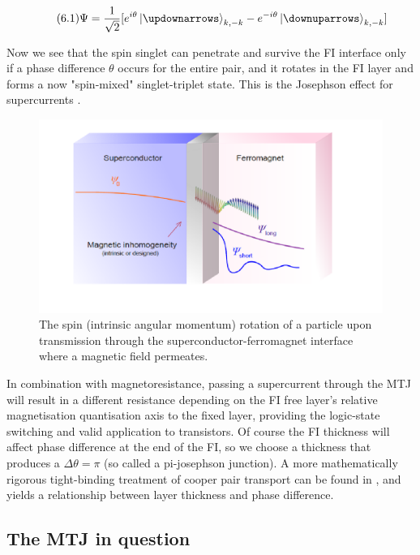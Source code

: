 \documentclass[12pt]{article}
\begin{document}
\begin{equation} \label{4.1} \tag{6.1}
\Psi=\frac{1}{\sqrt{2}}[e^{i\theta}\ket{\updownarrows}_{k,-k}- e^{-i\theta}\ket{\downuparrows}_{k,-k}]
\end{equation}

Now we see that the spin singlet can penetrate and survive the FI interface only if a phase difference $\theta$ occurs for the entire pair, and it rotates in the FI layer and forms a now "spin-mixed" singlet-triplet state. This is the Josephson effect for supercurrents \cite{josephson}. 
\begin{figure}[htp]
    \centering
    \begin{measuredfigure}
    \includegraphics[width=15cm]{rot}
    \caption{The spin (intrinsic angular momentum) rotation of a particle upon transmission through the superconductor-ferromagnet interface where a magnetic field permeates.}
    \end{measuredfigure}
    \end{figure}

In combination with magnetoresistance, passing a supercurrent through the MTJ will result in a different resistance depending on the FI free layer's relative magnetisation quantisation axis to the fixed layer, providing the logic-state switching and valid application to transistors. Of course the FI thickness will affect phase difference at the end of the FI, so we choose a thickness that produces a $\Delta\theta=\pi$ (so called a pi-josephson junction). A more mathematically rigorous tight-binding treatment of cooper pair transport can be found in \cite{JMTJpi}, and yields a relationship between layer thickness and phase difference.

\subsection{The MTJ in question}
\end{document}
